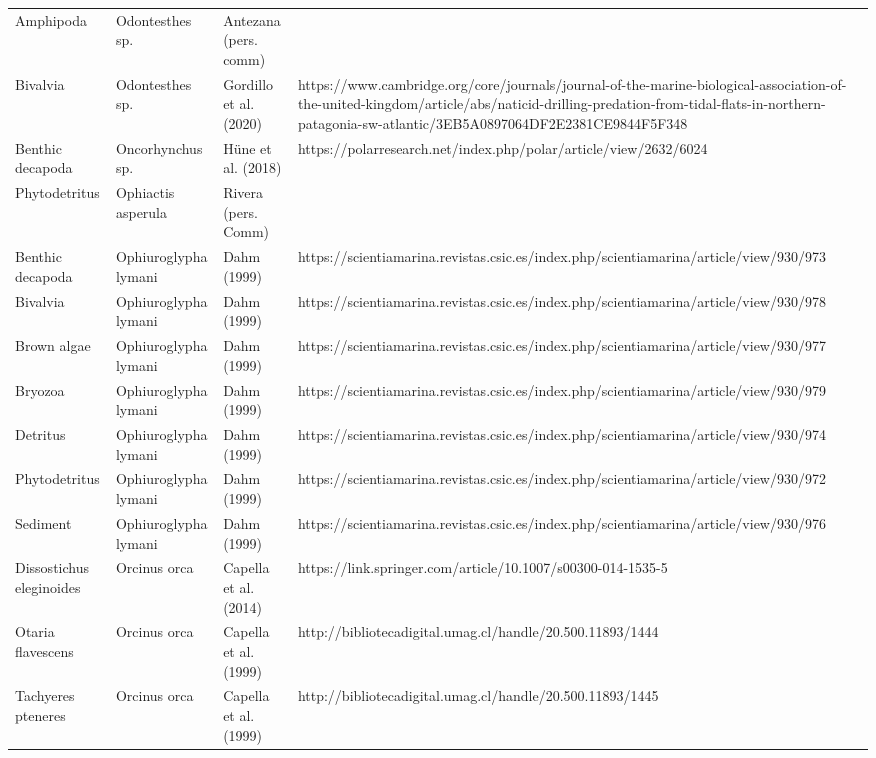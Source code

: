 \documentclass[
]{article}
\begin{document}
\begin{landscape}
\begin{longtable}[t]{>{\raggedright\arraybackslash}p{4cm}>{\centering\arraybackslash}p{4cm}>{\centering\arraybackslash}p{6cm}>{\centering\arraybackslash}p{6cm}}
Amphipoda & Odontesthes sp. & \tiny Antezana (pers. comm) & \tiny\\
Bivalvia & Odontesthes sp. & \tiny Gordillo et al. (2020) & \tiny https://www.cambridge.org/core/journals/journal-of-the-marine-biological-association-of-the-united-kingdom/article/abs/naticid-drilling-predation-from-tidal-flats-in-northern-patagonia-sw-atlantic/3EB5A0897064DF2E2381CE9844F5F348\\
\addlinespace
Benthic decapoda & Oncorhynchus sp. & \tiny Hüne et al. (2018) & \tiny https://polarresearch.net/index.php/polar/article/view/2632/6024\\
Phytodetritus & Ophiactis asperula & \tiny Rivera (pers. Comm) & \tiny\\
Benthic decapoda & Ophiuroglypha lymani & \tiny Dahm (1999) & \tiny https://scientiamarina.revistas.csic.es/index.php/scientiamarina/article/view/930/973\\
Bivalvia & Ophiuroglypha lymani & \tiny Dahm (1999) & \tiny https://scientiamarina.revistas.csic.es/index.php/scientiamarina/article/view/930/978\\
Brown algae & Ophiuroglypha lymani & \tiny Dahm (1999) & \tiny https://scientiamarina.revistas.csic.es/index.php/scientiamarina/article/view/930/977\\
\addlinespace
Bryozoa & Ophiuroglypha lymani & \tiny Dahm (1999) & \tiny https://scientiamarina.revistas.csic.es/index.php/scientiamarina/article/view/930/979\\
Detritus & Ophiuroglypha lymani & \tiny Dahm (1999) & \tiny https://scientiamarina.revistas.csic.es/index.php/scientiamarina/article/view/930/974\\
Phytodetritus & Ophiuroglypha lymani & \tiny Dahm (1999) & \tiny https://scientiamarina.revistas.csic.es/index.php/scientiamarina/article/view/930/972\\
Sediment & Ophiuroglypha lymani & \tiny Dahm (1999) & \tiny https://scientiamarina.revistas.csic.es/index.php/scientiamarina/article/view/930/976\\
Dissostichus eleginoides & Orcinus orca & \tiny Capella et al. (2014) & \tiny https://link.springer.com/article/10.1007/s00300-014-1535-5\\
\addlinespace
Otaria flavescens & Orcinus orca & \tiny Capella et al. (1999) & \tiny http://bibliotecadigital.umag.cl/handle/20.500.11893/1444\\
Tachyeres pteneres & Orcinus orca & \tiny Capella et al. (1999) & \tiny http://bibliotecadigital.umag.cl/handle/20.500.11893/1445\\

\end{longtable}
\end{landscape}
\end{document}
